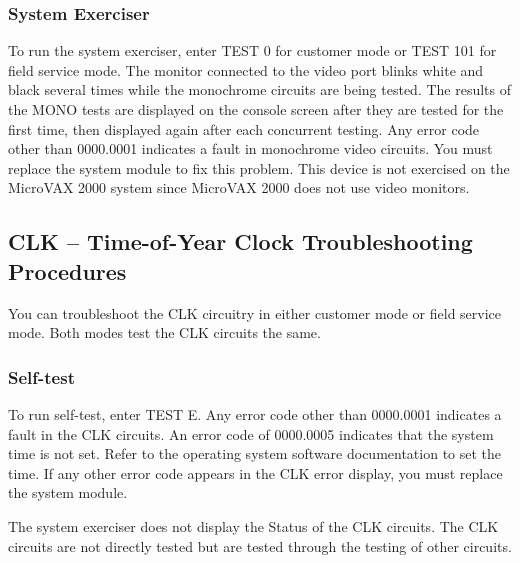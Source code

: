 \subsubsection{System Exerciser}

To run the system exerciser, enter TEST 0 for customer mode or TEST 101
for field service mode. The monitor connected to the video port blinks white
and black several times while the monochrome circuits are being tested. The
results of the MONO tests are displayed on the console screen after they are
tested for the first time, then displayed again after each concurrent testing.
Any error code other than 0000.0001 indicates a fault in monochrome video
circuits. You must replace the system module to fix this problem. This
device is not exercised on the MicroVAX 2000 system since MicroVAX 2000
does not use video monitors.

\subsection{CLK -- Time-of-Year Clock Troubleshooting Procedures}

You can troubleshoot the CLK circuitry in either customer mode or field
service mode. Both modes test the CLK circuits the same.

\subsubsection{Self-test}

To run self-test, enter TEST E. Any error code other than 0000.0001 
indicates a fault in the CLK circuits. An error code of 0000.0005 indicates that
the system time is not set. Refer to the operating system software 
documentation to set the time. If any other error code appears in the CLK error
display, you must replace the system module.

The system exerciser does not display the Status of the CLK circuits. The
CLK circuits are not directly tested but are tested through the testing of
other circuits.
